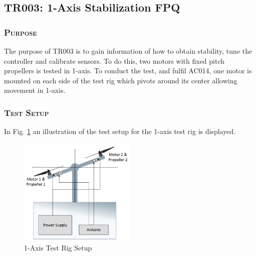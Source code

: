 \newpage


\subsection{TR003: 1-Axis Stabilization FPQ}
         {}
                         

\subsubsection*{\textsc{\medium Purpose}}
The purpose of TR003 is to gain information of how to obtain stability, tune the controller and calibrate sensors. To do this, two motors with fixed pitch propellers is tested in 1-axis. To conduct the test, and fulfil AC014, one motor is mounted on each side of the test rig which pivots around its center allowing movement in 1-axis. 

\subsubsection*{\textsc{\medium Test Setup}}
In Fig. \ref{fig:testsetup3} an illustration of the test setup for the 1-axis test rig is displayed. 
\begin{figure}[H]
    \centering
    \includegraphics[width = 0.5\textwidth]{VAPIQ-PICTURES/TestSetup3}
    \caption{1-Axis Test Rig Setup}
    \label{fig:testsetup3}
\end{figure}

